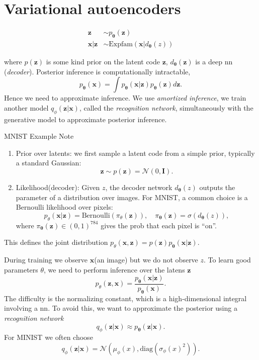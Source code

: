 \documentclass[../main.tex]{subfiles}
\begin{document}
\chapter{Variational autoencoders}

\[
\begin{aligned}
\boldsymbol{z} &\sim  p_{\boldsymbol{\theta}}(\boldsymbol{z}) \\
\boldsymbol{x} | \boldsymbol{z} &\sim  \text{Expfam}(\boldsymbol{x} | d_{\boldsymbol{\theta}}(z))
\end{aligned}
\]


where $p(\boldsymbol{z})$ is some kind prior on the latent code $\boldsymbol{z}$, $d_{\boldsymbol{\theta}}(\boldsymbol{z})$ is a deep nn (\emph{decoder}). Posterior inference is computationally intractable, 
\[
p_{\boldsymbol{\theta}}(\boldsymbol{x}) = \int p_{\boldsymbol{\theta}} (\boldsymbol{x} | \boldsymbol{z}) p_{\boldsymbol{\theta}}(\boldsymbol{z}) d \boldsymbol{z}.
\]
Hence we need to approximate inference.
We use \emph{amortized inference}, we train another model $q_{\phi}(\boldsymbol{z} | \boldsymbol{x})$, called the \emph{recognition network}, simultaneously with the generative 
model to approximate posterior inference.

\begin{note}{MNIST Example Note}
   \begin{enumerate}
   \item Prior over latents: we first sample a latent code from a simple prior, typically a standard Gaussian: 
   \[
   \boldsymbol{z} \sim p(\boldsymbol{z}) = \mathcal{N}(0, \boldsymbol{I}).
   \]
   \item Likelihood(decoder): Given $z$, the decoder network $d_{\boldsymbol{\theta}}(z)$ outputs the parameter of a distribution over images. For MNIST, a common choice is a Bernoulli likelihood over pixels:
   \[
   p_{\theta}(\boldsymbol{x} | \boldsymbol{z}) = \text{Bernoulli}(\pi_{\theta}(\boldsymbol{z})), \quad \pi_{\boldsymbol{\theta}}(\boldsymbol{z}) = \sigma (d_{\boldsymbol{\theta}}(z)),
   \]
   where $\pi_{\boldsymbol{\theta}}(\boldsymbol{z}) \in  (0,1) ^{784}$ gives the prob that each pixel is ``on''.
   \end{enumerate} 
   This defines the joint distribution $p_{\theta}(\boldsymbol{x},\boldsymbol{z}) = p(\boldsymbol{z})p_{\boldsymbol{\theta}}(\boldsymbol{x}|\boldsymbol{z})$.

   During training we observe $\boldsymbol{x}$(an image) but we do not observe $z$. To learn good parameters $\theta$, we need to perform inference over the latens $\boldsymbol{z}$
   \[
   p_{\theta}(\boldsymbol{z}, \boldsymbol{x}) = \frac{p_{\boldsymbol{\theta}}(\boldsymbol{x} | \boldsymbol{z})}{p_{\boldsymbol{\theta}}(\boldsymbol{x})}.
   \]
   The difficulty is the normalizing constant, which is a high-dimensional integral involving a nn. To avoid this, we want to approximate the posterior using a \emph{recognition network}
   \[
   q_{\phi}(\boldsymbol{z} |\boldsymbol{x})  \approx p_{\boldsymbol{\theta}}(\boldsymbol{z} | \boldsymbol{x}).
   \]
   For MINIST we often choose
   \[
   q_{\phi}(\boldsymbol{z} | \boldsymbol{x}) = \mathcal{N}(\mu_{\phi}(x) , \text{diag}\left( \sigma_{\phi}(x)^{2} \right) ).
   \]
\end{note} 
\end{document}
